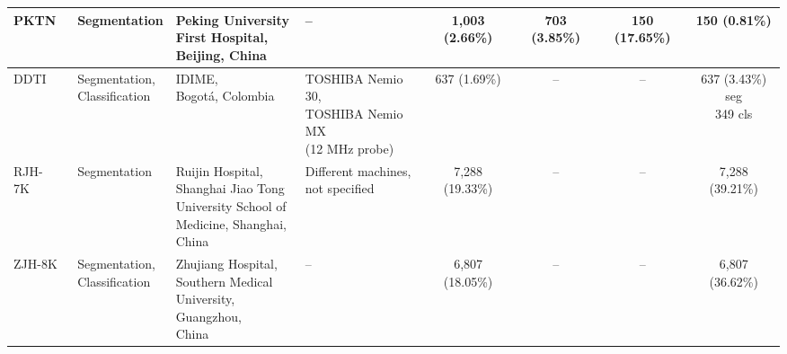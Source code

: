 \begin{table}[p]
{\begin{tabular}{llllcccc}
PKTN~\cite{sun2025clip} & Segmentation & \makecell[l]{Peking University\\First Hospital,\\Beijing, China} & -- & 1{,}003 (2.66\%) & 703 (3.85\%) & 150 (17.65\%) & 150 (0.81\%) \\
\midrule
DDTI~\cite{pedraza2015open} & \makecell[c]{Segmentation,\\Classification} & \makecell[l]{IDIME,\\Bogot\'{a}, Colombia} & \makecell[l]{TOSHIBA Nemio 30,\\TOSHIBA Nemio MX\\(12 MHz probe)} & 637 (1.69\%) & -- & -- & \makecell[c]{637 (3.43\%) seg\\349 cls} \\
RJH-7K~\cite{shusharina2021segmentation} & Segmentation & \makecell[l]{Ruijin Hospital,\\Shanghai Jiao Tong\\University School of\\Medicine, Shanghai,\\China} & \makecell[l]{Different machines,\\not specified} & 7{,}288 (19.33\%) & -- & -- & 7{,}288 (39.21\%) \\
ZJH-8K & \makecell[c]{Segmentation,\\Classification} & \makecell[l]{Zhujiang Hospital,\\Southern Medical\\University, Guangzhou,\\China} & -- & 6{,}807 (18.05\%) & -- & -- & 6{,}807 (36.62\%) \\
\bottomrule
\end{tabular}%
}
\end{table}
\clearpage
